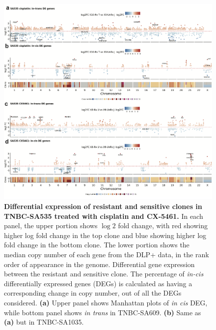 \begin{figure}
\centering
  \includegraphics[width=\textwidth]{Figures/chap5/trackplotsSA535.png}
\caption[DE of resistant and sensitive clonealign defined clones]
	{\small
	\textbf{Differential expression of resistant and sensitive clones in TNBC-SA535 treated with cisplatin and CX-5461.}
 In each panel, the upper portion shows $\log 2$ fold change, with red showing higher log fold change in the top clone and blue showing higher log fold change in the bottom clone. The lower portion shows the median copy number of each gene from the DLP+ data, in the rank order of appearance in the genome.  Differential gene expression between the resistant and sensitive clone. The percentage of \textit{in-cis} differentially expressed genes (DEGs) is calculated as having a corresponding change in copy number, out of all the DEGs considered. 
 \textbf{(a)} Upper panel shows Manhattan plots of \textit{in cis} DEG, while bottom panel shows \textit{in trans} in TNBC-SA609.
 \textbf{(b)} Same as  \textbf{(a)} but in TNBC-SA1035.
}
	\label{fig:trackplotsSA535}
 \end{figure}

